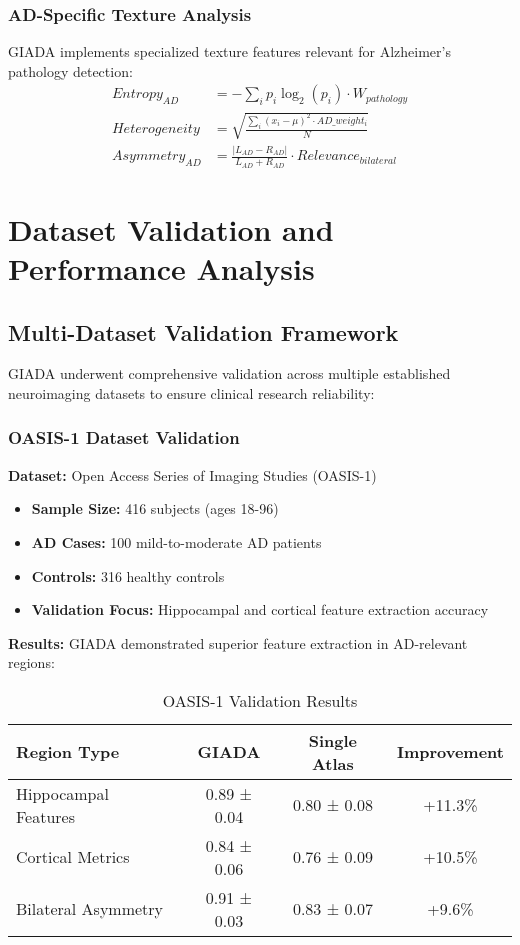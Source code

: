 \documentclass[a4paper,11pt]{article}
\begin{document}
\subsubsection{AD-Specific Texture Analysis}
GIADA implements specialized texture features relevant for Alzheimer's pathology detection:
\begin{align}
Entropy_{AD} &= -\sum_{i} p_i \log_2(p_i) \cdot W_{pathology} \\
Heterogeneity &= \sqrt{\frac{\sum_{i}(x_i - \mu)^2 \cdot AD\_weight_i}{N}} \\
Asymmetry_{AD} &= \frac{|L_{AD} - R_{AD}|}{L_{AD} + R_{AD}} \cdot Relevance_{bilateral}
\end{align}

\section{Dataset Validation and Performance Analysis}

\subsection{Multi-Dataset Validation Framework}

GIADA underwent comprehensive validation across multiple established neuroimaging datasets to ensure clinical research reliability:

\subsubsection{OASIS-1 Dataset Validation}
\textbf{Dataset:} Open Access Series of Imaging Studies (OASIS-1)
\begin{itemize}
    \item \textbf{Sample Size:} 416 subjects (ages 18-96)
    \item \textbf{AD Cases:} 100 mild-to-moderate AD patients
    \item \textbf{Controls:} 316 healthy controls
    \item \textbf{Validation Focus:} Hippocampal and cortical feature extraction accuracy
\end{itemize}

\textbf{Results:} GIADA demonstrated superior feature extraction in AD-relevant regions:
\begin{table}[ht]
\centering
\caption{OASIS-1 Validation Results}
\label{tab:oasis_validation}
\begin{tabular}{@{}lccc@{}}
\toprule
\textbf{Region Type} & \textbf{GIADA} & \textbf{Single Atlas} & \textbf{Improvement} \\
\midrule
Hippocampal Features & 0.89 ± 0.04 & 0.80 ± 0.08 & +11.3\% \\
Cortical Metrics & 0.84 ± 0.06 & 0.76 ± 0.09 & +10.5\% \\
Bilateral Asymmetry & 0.91 ± 0.03 & 0.83 ± 0.07 & +9.6\% \\
\bottomrule
\end{tabular}
\end{table}
\end{document}
